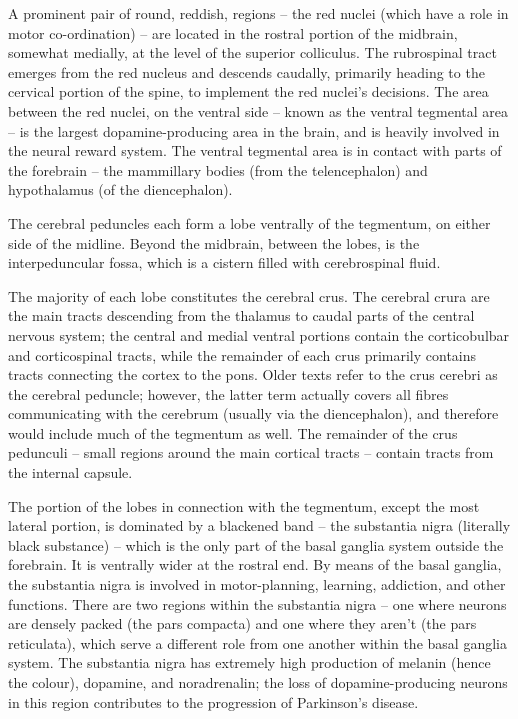 A prominent pair of round, reddish, regions -- the red nuclei (which have a role in motor co-ordination) -- are located in the rostral portion of the midbrain, somewhat medially, at the level of the superior colliculus. The rubrospinal tract emerges from the red nucleus and descends caudally, primarily heading to the cervical portion of the spine, to implement the red nuclei's decisions. The area between the red nuclei, on the ventral side -- known as the ventral tegmental area -- is the largest dopamine-producing area in the brain, and is heavily involved in the neural reward system. The ventral tegmental area is in contact with parts of the forebrain -- the mammillary bodies (from the telencephalon) and hypothalamus (of the diencephalon).

The cerebral peduncles each form a lobe ventrally of the tegmentum, on either side of the midline. Beyond the midbrain, between the lobes, is the interpeduncular fossa, which is a cistern filled with cerebrospinal fluid.

The majority of each lobe constitutes the cerebral crus. The cerebral crura are the main tracts descending from the thalamus to caudal parts of the central nervous system; the central and medial ventral portions contain the corticobulbar and corticospinal tracts, while the remainder of each crus primarily contains tracts connecting the cortex to the pons. Older texts refer to the crus cerebri as the cerebral peduncle; however, the latter term actually covers all fibres communicating with the cerebrum (usually via the diencephalon), and therefore would include much of the tegmentum as well. The remainder of the crus pedunculi -- small regions around the main cortical tracts -- contain tracts from the internal capsule.

The portion of the lobes in connection with the tegmentum, except the most lateral portion, is dominated by a blackened band -- the substantia nigra (literally black substance) -- which is the only part of the basal ganglia system outside the forebrain. It is ventrally wider at the rostral end. By means of the basal ganglia, the substantia nigra is involved in motor-planning, learning, addiction, and other functions. There are two regions within the substantia nigra -- one where neurons are densely packed (the pars compacta) and one where they aren't (the pars reticulata), which serve a different role from one another within the basal ganglia system. The substantia nigra has extremely high production of melanin (hence the colour), dopamine, and noradrenalin; the loss of dopamine-producing neurons in this region contributes to the progression of Parkinson's disease.

